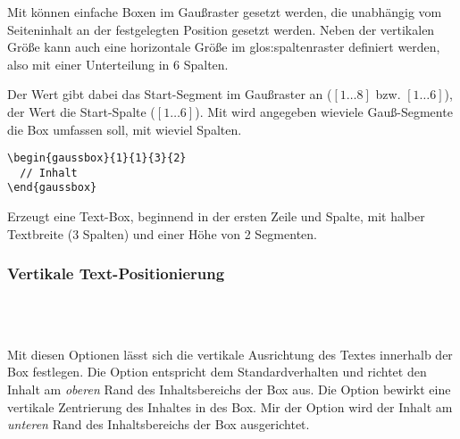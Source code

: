 Mit  können einfache Boxen im Gaußraster gesetzt werden,
die unabhängig vom Seiteninhalt an der festgelegten Position gesetzt werden.
Neben der vertikalen Größe kann auch eine horizontale Größe im
\gls{glos:spaltenraster}
definiert werden, also mit einer Unterteilung in 6 Spalten.

Der Wert  gibt dabei das Start-Segment im Gaußraster an
($[1\ldots 8]$ bzw. $[1\ldots6]$),
der Wert  die Start-Spalte ($[1\ldots6]$).
Mit  wird angegeben wieviele Gauß-Segmente die Box umfassen soll,
mit  wieviel Spalten.

\begin{example}\hfill
  \begin{lstlisting}
\begin{gaussbox}{1}{1}{3}{2}
  // Inhalt
\end{gaussbox}
  \end{lstlisting}
  Erzeugt eine Text-Box, beginnend in der ersten Zeile und Spalte,
  mit halber Textbreite (3 Spalten) und einer Höhe von 2 Segmenten.
\end{example}


\subsubsection{Vertikale Text-Positionierung}

\begin{Declaration}
  \\
  \\
\end{Declaration}

Mit diesen Optionen lässt sich die vertikale Ausrichtung des Textes innerhalb
der Box festlegen. Die Option  entspricht dem Standardverhalten und richtet
den Inhalt am \emph{oberen} Rand des Inhaltsbereichs der Box aus.
Die Option  bewirkt eine vertikale Zentrierung des Inhaltes in des Box.
Mir der Option  wird der Inhalt am \emph{unteren} Rand des
Inhaltsbereichs der Box ausgerichtet.

\begin{Declaration}
  \\
\end{Declaration}

